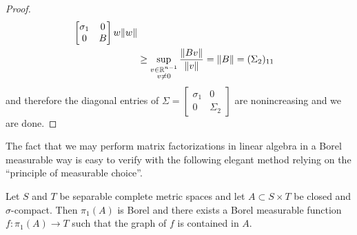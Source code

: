 \begin{proof}
\begin{align*}
{{\begin{bmatrix}
\sigma_1 & 0 \\
0 & B
\end{bmatrix}w}} {\left \lVert w \right \rVert} \\
&\geq \sup_{\substack {v \in \mathbb{R}^{n-1} \\ v \neq 0}} \frac{\left \lVert Bv \right \rVert} {\left \lVert v \right \rVert} 
= \left \lVert B \right \rVert = (\Sigma_2)_{11}\\
\end{align*}
and therefore the diagonal entries of $\Sigma=\begin{bmatrix}
\sigma_1 & 0 \\
0 & \Sigma_2
\end{bmatrix}$ are nonincreasing and we are done.
\end{proof}

The fact that we may perform matrix factorizations in linear algebra in a Borel measurable way is easy to verify with the following elegant method relying on the ``principle of measurable choice''.
\begin{thm}\label{PrincipleOfMeasurableChoice}Let $S$ and $T$ be separable complete metric spaces and let $A \subset S \times T$ be closed and $\sigma$-compact.  Then $\pi_1(A)$ is Borel and there exists a Borel measurable function $f : \pi_1(A) \to T$ such that the graph of $f$ is contained in $A$.
\end{thm}
